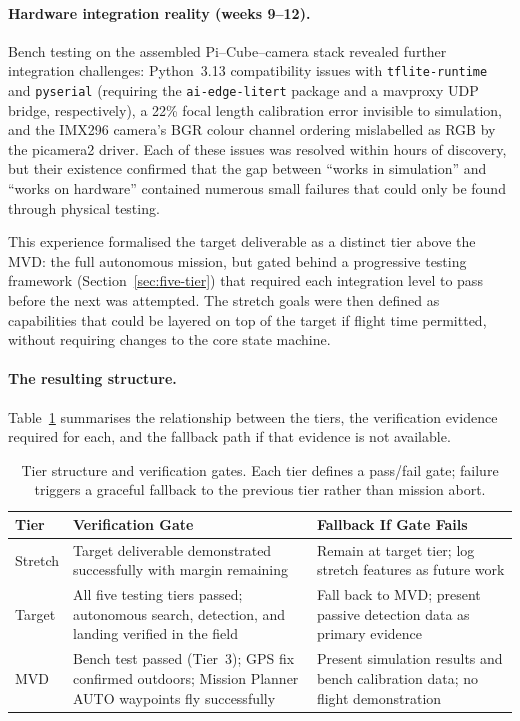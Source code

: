 \paragraph{Hardware integration reality (weeks 9--12).}
Bench testing on the assembled Pi--Cube--camera stack revealed further integration challenges: Python~3.13 compatibility issues with \texttt{tflite-runtime} and \texttt{pyserial} (requiring the \texttt{ai-edge-litert} package and a mavproxy UDP bridge, respectively), a 22\% focal length calibration error invisible to simulation, and the IMX296 camera's BGR colour channel ordering mislabelled as RGB by the picamera2 driver.  Each of these issues was resolved within hours of discovery, but their existence confirmed that the gap between ``works in simulation'' and ``works on hardware'' contained numerous small failures that could only be found through physical testing.

This experience formalised the target deliverable as a distinct tier above the MVD: the full autonomous mission, but gated behind a progressive testing framework (Section~\ref{sec:five-tier}) that required each integration level to pass before the next was attempted.  The stretch goals were then defined as capabilities that could be layered on top of the target if flight time permitted, without requiring changes to the core state machine.

\paragraph{The resulting structure.}
Table~\ref{tab:tier-evolution-summary} summarises the relationship between the tiers, the verification evidence required for each, and the fallback path if that evidence is not available.

\begin{table}[htbp]
  \centering\small
  \caption{Tier structure and verification gates.  Each tier defines a pass/fail gate; failure triggers a graceful fallback to the previous tier rather than mission abort.}\label{tab:tier-evolution-summary}
  \begin{tabularx}{\linewidth}{@{}p{2.0cm}p{4.5cm}X@{}}
    \toprule
    \textbf{Tier} & \textbf{Verification Gate} & \textbf{Fallback If Gate Fails} \\
    \midrule
    Stretch & Target deliverable demonstrated successfully with margin remaining & Remain at target tier; log stretch features as future work \\
    Target & All five testing tiers passed; autonomous search, detection, and landing verified in the field & Fall back to MVD; present passive detection data as primary evidence \\
    MVD & Bench test passed (Tier~3); GPS fix confirmed outdoors; Mission Planner AUTO waypoints fly successfully & Present simulation results and bench calibration data; no flight demonstration \\
    \bottomrule
  \end{tabularx}
\end{table}

